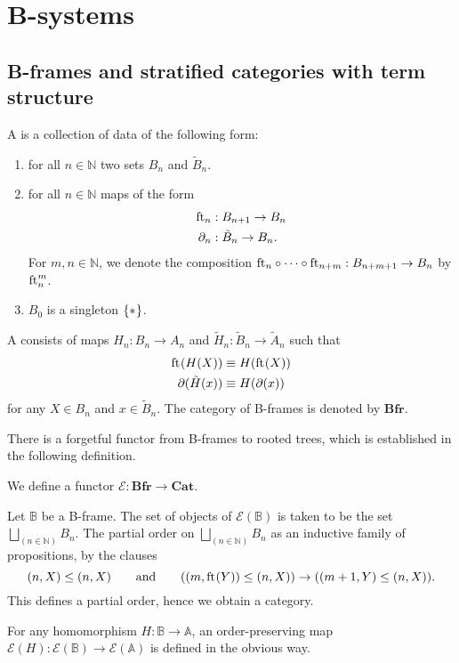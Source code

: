 \section{B-systems}

\subsection{B-frames and stratified categories with term structure}

\begin{defn}
A  is a collection of data of the following form:
\begin{enumerate}
\item for all $n\in\mathbb{N}$ two sets $B_n$ and $\tilde{B}_n$. 
\item for all $n\in\mathbb{N}$ maps of the form
\begin{align*}
\eft[n] & : B_{n+1}\to B_n \\
\ebd[n] & : \tilde{B}_n\to B_n.
\end{align*}
For $m,n\in\mathbb{N}$, we denote the composition $\eft[n]\circ\cdots\circ\eft[n+m]:B_{n+m+1}\to B_n$ by $\eft[n]^m$. 
\item $B_0$ is a singleton $\{\pt\}$.
\end{enumerate} 
A  consists of maps
$H_n:B_n\to A_n$ and $\tilde{H}_n:\tilde{B}_n\to\tilde{A}_n$ such that
\begin{align*}
\eft(H(X)) & \jdeq H(\eft(X)) \\
\ebd(\tilde{H}(x)) & \jdeq H(\ebd(x))
\end{align*}
for any $X\in B_n$ and $x\in\tilde{B}_n$. The category of B-frames is
denoted by $\mathbf{Bfr}$. 
\end{defn}

There is a forgetful functor from B-frames to rooted trees, which is established in the following definition.

\begin{defn}
We define a functor $\mathcal{E}:\mathbf{Bfr}\to\mathbf{Cat}$.
\end{defn}

\begin{constr}
Let $\mathbb{B}$ be a B-frame.
The set of objects of $\mathcal{E}(\mathbb{B})$ is taken to be the set $\bigsqcup_{(n\in\mathbb{N})}B_n$. 
The partial order on $\bigsqcup_{(n\in\mathbb{N})}B_n$ as an inductive family of propositions, by the clauses
\begin{equation*}
(n,X)\leq (n,X) \qquad\text{and}\qquad
((m,\eft(Y))\leq (n,X))\to((m+1,Y)\leq (n,X)).
\end{equation*}
This defines a partial order, hence we obtain a category.

For any homomorphism $H:\mathbb{B}\to\mathbb{A}$, an order-preserving map $\mathcal{E}(H):\mathcal{E}(\mathbb{B})\to\mathcal{E}(\mathbb{A})$ is defined in the obvious way. 
\end{constr}

